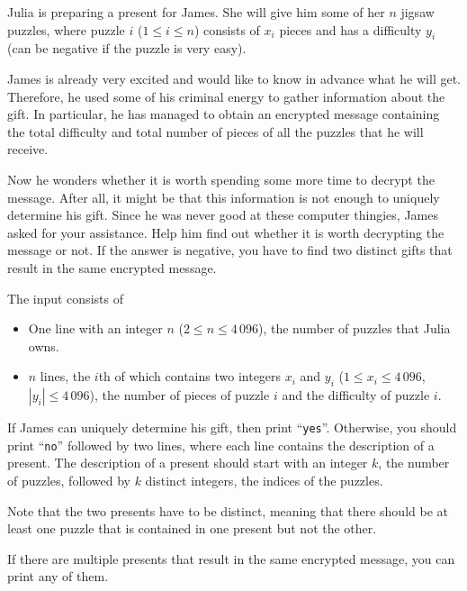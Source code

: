 
%
Julia is preparing a present for James. She will give him some of her $n$ jigsaw puzzles, where puzzle $i$ ($1 \leq i \leq n$) consists of $x_i$ pieces and has a difficulty $y_i$ (can be negative if the puzzle is very easy).

James is already very excited and would like to know in advance what he will get. Therefore, he used some of his criminal energy to gather information about the gift. In particular, he has managed to obtain an encrypted message containing the total difficulty and total number of pieces of all the puzzles that he will receive. 

Now he wonders whether it is worth spending some more time to decrypt the message. After all, it might be that this information is not enough to uniquely determine his gift. Since he was never good at these computer thingies, James asked for your assistance. Help him find out whether it is worth decrypting the message or not. If the answer is negative, you have to find two distinct gifts that result in the same encrypted message.

\begin{Input}
    The input consists of
    \begin{itemize}
        \item One line with an integer $n$ ($2 \leq n \leq 4\,096$), the number of puzzles that Julia owns.
        \item $n$ lines, the $i$th of which contains two integers $x_i$ and $y_i$ ($1 \leq x_i \leq 4\,096$, $\left|y_i\right| \leq 4\,096$), the number of pieces of puzzle $i$ and the difficulty of puzzle $i$.
    \end{itemize}
\end{Input}

\begin{Output}
  If James can uniquely determine his gift, then print ``\texttt{yes}''. Otherwise, you should print ``\texttt{no}'' followed by two lines,
  where each line contains the description of a present. The description of a present should start with an
  integer $k$, the number of puzzles, followed by $k$ distinct integers, the indices of the puzzles. 

  Note that the two presents have to be distinct, meaning that there should be at least one puzzle that is contained 
  in one present but not the other.

  If there are multiple presents that result in the same encrypted message, you can print any of them.
\end{Output}

